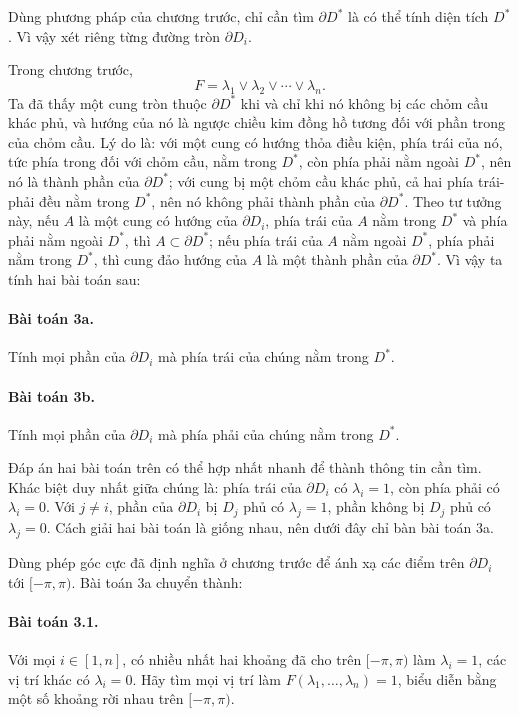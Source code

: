\documentclass[11pt]{article}
\begin{document}
Dùng phương pháp của chương trước, chỉ cần tìm \(\partial D^*\) là có thể tính
diện tích \(D^*\). Vì vậy xét riêng từng đường tròn \(\partial D_i\).

Trong chương trước,
\[
  F=\lambda_1\vee\lambda_2\vee\cdots\vee\lambda_n.
\]
Ta đã thấy một cung tròn thuộc \(\partial D^*\) khi và chỉ khi nó không bị các
chỏm cầu khác phủ, và hướng của nó là ngược chiều kim đồng hồ tương đối với
phần trong của chỏm cầu. Lý do là: với một cung có hướng thỏa điều kiện, phía
trái của nó, tức phía trong đối với chỏm cầu, nằm trong \(D^*\), còn phía phải
nằm ngoài \(D^*\), nên nó là thành phần của \(\partial D^*\); với cung bị một
chỏm cầu khác phủ, cả hai phía trái-phải đều nằm trong \(D^*\), nên nó không
phải thành phần của \(\partial D^*\). Theo tư tưởng này, nếu \(A\) là một cung
có hướng của \(\partial D_i\), phía trái của \(A\) nằm trong \(D^*\) và phía
phải nằm ngoài \(D^*\), thì \(A\subset\partial D^*\); nếu phía trái của \(A\)
nằm ngoài \(D^*\), phía phải nằm trong \(D^*\), thì cung đảo hướng của \(A\) là
một thành phần của \(\partial D^*\). Vì vậy ta tính hai bài toán sau:

\paragraph{Bài toán 3a.}
Tính mọi phần của \(\partial D_i\) mà phía trái của chúng nằm trong \(D^*\).

\paragraph{Bài toán 3b.}
Tính mọi phần của \(\partial D_i\) mà phía phải của chúng nằm trong \(D^*\).

Đáp án hai bài toán trên có thể hợp nhất nhanh để thành thông tin cần tìm. Khác
biệt duy nhất giữa chúng là: phía trái của \(\partial D_i\) có \(\lambda_i=1\),
còn phía phải có \(\lambda_i=0\). Với \(j\ne i\), phần của \(\partial D_i\) bị
\(D_j\) phủ có \(\lambda_j=1\), phần không bị \(D_j\) phủ có \(\lambda_j=0\).
Cách giải hai bài toán là giống nhau, nên dưới đây chỉ bàn bài toán 3a.

Dùng phép góc cực đã định nghĩa ở chương trước để ánh xạ các điểm trên
\(\partial D_i\) tới \([-\pi,\pi)\). Bài toán 3a chuyển thành:

\paragraph{Bài toán 3.1.}
Với mọi \(i\in[1,n]\), có nhiều nhất hai khoảng đã cho trên \([-\pi,\pi)\) làm
\(\lambda_i=1\), các vị trí khác có \(\lambda_i=0\). Hãy tìm mọi vị trí làm
\(F(\lambda_1,\ldots,\lambda_n)=1\), biểu diễn bằng một số khoảng rời nhau trên
\([-\pi,\pi)\).
\end{document}
